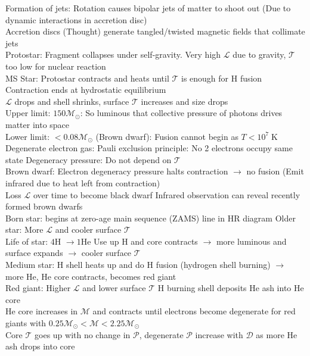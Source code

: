 \documentclass{article}
\DeclareMathOperator{\K}{K}
\begin{document}
Formation of jets: Rotation causes bipolar jets of matter to shoot out (Due to dynamic interactions in accretion disc)\\
Accretion discs (Thought) generate tangled/twisted magnetic fields that collimate jets\\
Protostar: Fragment collapses under self-gravity. Very high $\mathcal{L}$ due to gravity, $\mathcal{T}$ too low for nuclear reaction\\
MS Star: Protostar contracts and heats until $\mathcal{T}$ is enough for H fusion \quad Contraction ends at hydrostatic equilibrium\\
$\mathcal{L}$ drops and shell shrinks, surface $\mathcal{T}$ increases and size drops\\
Upper limit: $150\mathcal{M}_{\odot}$: So luminous that collective pressure of photons drives matter into space\\
Lower limit: $<0.08\mathcal{M}_{\odot}$ (Brown dwarf): Fusion cannot begin as $T<10^{7}\K$\\
Degenerate electron gas: Pauli exclusion principle: No 2 electrons occupy same state \qquad Degeneracy pressure: Do not depend on $\mathcal{T}$\\
Brown dwarf: Electron degeneracy pressure halts contraction $\rightarrow$ no fusion (Emit infrared due to heat left from contraction)\\
Loss $\mathcal{L}$ over time to become black dwarf \quad Infrared observation can reveal recently formed brown dwarfs\\
Born star: begins at zero-age main sequence (ZAMS) line in HR diagram \quad Older star: More $\mathcal{L}$ and cooler surface $\mathcal{T}$\\
Life of star: $4$H $\rightarrow 1$He \quad Use up H and core contracts $\rightarrow$ more luminous and surface expands $\rightarrow$ cooler surface $\mathcal{T}$\\
Medium star: H shell heats up and do H fusion (hydrogen shell burning) $\rightarrow$ more He, He core contracts, becomes red giant\\
Red giant: Higher $\mathcal{L}$ and lower surface $\mathcal{T}$ \quad H burning shell deposits He ash into He core\\
He core increases in $\mathcal{M}$ and contracts until electrons become degenerate for red giants with $0.25\mathcal{M}_{\odot}<\mathcal{M}<2.25\mathcal{M}_{\odot}$\\
Core $\mathcal{T}$ goes up with no change in $\mathcal{P}$, degenerate $\mathcal{P}$ increase with $\mathcal{D}$ as more He ash drops into core\\
\end{document}
